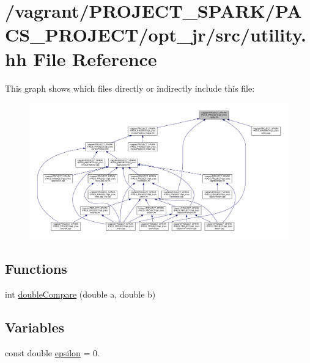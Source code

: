 \hypertarget{utility_8hh}{\section{/vagrant/\-P\-R\-O\-J\-E\-C\-T\-\_\-\-S\-P\-A\-R\-K/\-P\-A\-C\-S\-\_\-\-P\-R\-O\-J\-E\-C\-T/opt\-\_\-jr/src/utility.hh File Reference}
\label{utility_8hh}
}
This graph shows which files directly or indirectly include this file\-:\nopagebreak
\begin{figure}[H]
\begin{center}
\leavevmode
\includegraphics[width=350pt]{utility_8hh__dep__incl}
\end{center}
\end{figure}
\subsection*{Functions}
\begin{DoxyCompactItemize}
\item 
int \hyperlink{utility_8hh_a9d47b6f031f040e12b256b8aaca54671}{double\-Compare} (double a, double b)
\end{DoxyCompactItemize}
\subsection*{Variables}
\begin{DoxyCompactItemize}
\item 
const double \hyperlink{utility_8hh_ac29df3dcbefa1ce189e5990bde994025}{epsilon} = 0.
\end{DoxyCompactItemize}


